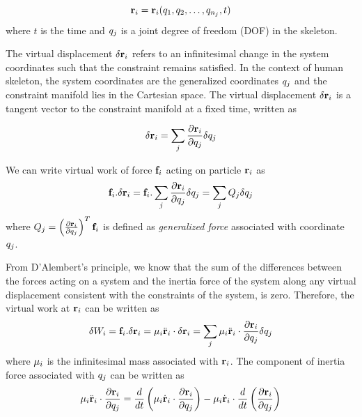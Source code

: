 \begin{equation}\label{eq:general_coord}
    \mathbf{r}_i = \mathbf{r}_i(q_{1},
q_{2}, \ldots, q_{n_j}, t)
\end{equation}
where $t$ is the time and $q_j$ is a joint degree of freedom (DOF) in
the skeleton.

The virtual displacement $\delta \mathbf{r}_i$ refers to an
infinitesimal change in the system coordinates such that the
constraint remains satisfied. In the context of human skeleton, the
system coordinates are the generalized coordinates $q_j$ and the
constraint manifold lies in the Cartesian space. The virtual
displacement $\delta \mathbf{r}_i$ is a tangent vector to the
constraint manifold at a fixed time, written as

\begin{equation}\label{eq:virtual_displace}
    \delta \mathbf{r}_i = \sum_j \frac{\partial \mathbf{r}_i}{\partial
    q_j}\delta q_j
\end{equation}

We can write virtual work of force $\mathbf{f}_{i}$ acting on particle
$\mathbf{r}_i$ as
\begin{equation}\label{eq:virtual_work}
  \mathbf{f}_{i} . \delta \mathbf{r}_i = \mathbf{f}_{i} . \sum_j \frac{\partial \mathbf{r}_i}{\partial
    q_j}\delta q_j = \sum_j Q_{j} \delta q_j
\end{equation}
where $Q_{j} = \left ( \frac{\partial \mathbf{r}_i}{\partial q_j} \right )^T \mathbf{f}_i$ is defined as \emph{generalized force}
associated with coordinate $q_j$.

From D'Alembert's principle, we know that the sum of the differences
between the forces acting on a system and the inertia force of the
system along any virtual displacement consistent with the constraints
of the system, is zero. Therefore, the virtual work at $\mathbf{r}_i$ can be written as
\begin{equation}\label{eq:inertial_work}
  \delta W_i = \mathbf{f}_{i} . \delta \mathbf{r}_i = \mathbf{\mu}_i \ddot{\mathbf{r}}_i \cdot
    \delta \mathbf{r}_i = \sum_j \mathbf{\mu}_i \ddot{\mathbf{r}}_i \cdot
    \frac{\partial \mathbf{r}_i}{\partial q_j} \delta q_j
\end{equation}
where $\mathbf{\mu}_i$ is the infinitesimal mass associated with
$\mathbf{r}_i$. The component of inertia force associated with
$q_j$ can be written as
\begin{equation}
\label{eq:inertia_force}
  \mathbf{\mu}_i \ddot{\mathbf{r}}_i \cdot \frac{\partial \mathbf{r}_i}{\partial q_j} =
  \frac{d}{dt} \left( \mathbf{\mu}_i \dot{\mathbf{r}}_i \cdot \frac{\partial
  \mathbf{r}_i}{\partial q_j} \right) - \mathbf{\mu}_i
\dot{\mathbf{r}}_i \cdot \frac{d}{dt} \left( \frac{\partial
    \mathbf{r}_i}{\partial q_j} \right) 
\end{equation}

